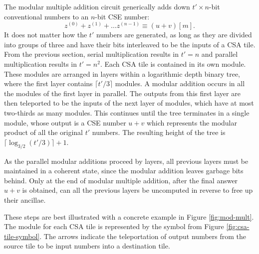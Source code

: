 \documentclass[twoside]{article}
\begin{document}
The modular multiple addition circuit generically adds down $t'\times n$-bit
conventional numbers to an $n$-bit CSE number:
%
\begin{equation}
z^{(0)} + z^{(1)} + \ldots z^{(n-1)} \equiv (u+v)[m].
\end{equation}
%
It does not matter how the
$t'$ numbers are generated, as long as they are divided into groups of three
and have their bits interleaved to be the inputs of a CSA tile.
From the previous section, serial multiplication results in
$t' = n$ and parallel multiplication results in $t' = n^2$. Each CSA tile
is contained in its own module. These modules are arranged in layers within
a logarithmic depth binary tree, where 
the first layer contains $\lceil t'/3 \rceil$ modules. A modular addition
occurs in all the modules of the first layer in parallel. The outputs from this
first layer are then teleported to be the inputs of the next layer of modules,
which have at most two-thirds as many modules. This continues until the
tree terminates in a single module, whose output is a CSE number $u+v$ which
represents the modular product of all the original $t'$ numbers. The resulting
height of the tree is $\lceil \log_{3/2}(t'/3) \rceil + 1$.

As the parallel modular additions proceed by layers, all previous layers
must be maintained in a coherent state, since the modular addition leaves
garbage bits behind. Only at the end of modular multiple addition, after
the final answer $u+v$ is obtained, can all the previous layers be
uncomputed in reverse to free up their ancillae.

These steps are best illustrated with a concrete
example in Figure \ref{fig:mod-mult}. The module for each CSA tile is
represented by the symbol from Figure \ref{fig:csa-tile-symbol}.
The arrows indicate the
teleportation of output numbers from the source tile to be input numbers
into a destination tile.
\end{document}
